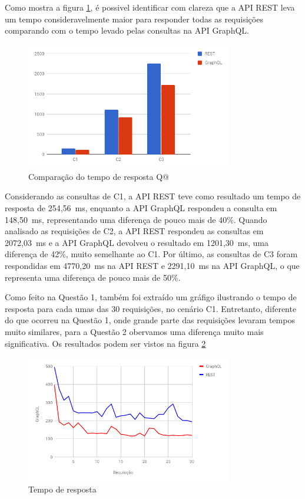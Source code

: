 Como mostra a figura \ref{fig:q2-time}, é possivel identificar com clareza que a API REST leva um tempo consideravelmente maior para responder todas as requisições comparando com o tempo levado pelas consultas na API GraphQL.

\begin{figure}[htbp]
    \centering
    \includegraphics[width=0.8\textwidth]{figuras/q1-time.png}
    \caption{Comparação do tempo de resposta Q@}
    \label{fig:q2-time}
    \author{fonte: Autor}
\end{figure}

Considerando as consultas de C1, a API REST teve como resultado um tempo de resposta de 254,56~ms, enquanto a API GraphQL respondeu a consulta em 148,50~ms, representando uma diferença de pouco mais de 40\%. Quando analisado as requisições de C2, a API REST respondeu as consultas em 2072,03~ms e a API GraphQL devolveu o resultado em 1201,30~ms, uma diferença de 42\%, muito semelhante ao C1. Por último, as consultas de C3 foram respondidas em 4770,20~ms na API REST e 2291,10~ms na API GraphQL, o que representa uma diferença de pouco mais de 50\%.

Como feito na Questão 1, também foi extraído um gráfigo ilustrando o tempo de resposta para cada umas das 30 requisições, no cenário C1. Entretanto, diferente do que ocorreu na Questão 1, onde grande parte das requisições levaram tempos muito similares, para a Questão 2 obervamos uma diferença muito mais significativa. Os resultados podem ser vistos na figura \ref{fig:q2-time-line}

\begin{figure}[htbp]
    \centering
    \includegraphics[width=0.8\textwidth]{figuras/q2-time-line.png}
    \caption{Tempo de resposta}
    \label{fig:q2-time-line}
    \author{fonte: Autor}
\end{figure}

